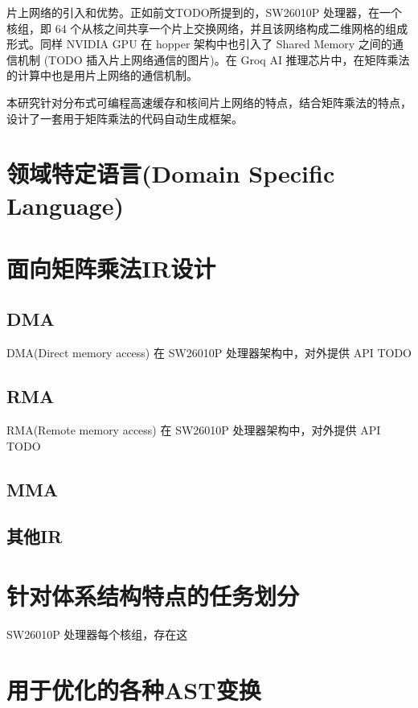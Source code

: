 片上网络的引入和优势。正如前文TODO所提到的，SW26010P 处理器，在一个核组，即 64 个从核之间共享一个片上交换网络，并且该网络构成二维网格的组成形式。同样 NVIDIA GPU 在 hopper 架构中也引入了 Shared Memory 之间的通信机制 (TODO 插入片上网络通信的图片)。在 Groq AI 推理芯片中，在矩阵乘法的计算中也是用片上网络的通信机制。

本研究针对分布式可编程高速缓存和核间片上网络的特点，结合矩阵乘法的特点，设计了一套用于矩阵乘法的代码自动生成框架。




\section{领域特定语言(Domain Specific Language)}


\section{面向矩阵乘法IR设计}

\subsection{DMA}

DMA(Direct memory access) 在 SW26010P 处理器架构中，对外提供 API TODO


\subsection{RMA}

RMA(Remote memory access) 在 SW26010P 处理器架构中，对外提供 API TODO

\subsection{MMA}

\subsection{其他IR}


\section{针对体系结构特点的任务划分}

SW26010P 处理器每个核组，存在这



\section{用于优化的各种AST变换}


